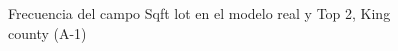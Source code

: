 \begin{figure}[H]
    \centering
    
    \caption{Frecuencia del campo Sqft lot en el modelo real y Top 2, King county (A-1)}
    \label{frecuency-top2-sqft lot}
\end{figure}